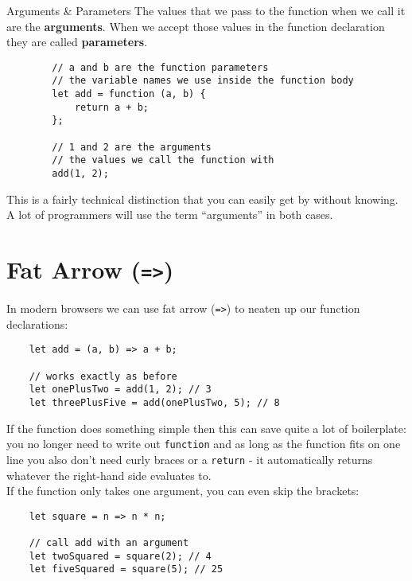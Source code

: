 \begin{infobox}{Arguments \& Parameters}
    The values that we pass to the function when we call it are the \textbf{arguments}. When we accept those values in the function declaration they are called \textbf{parameters}.

    \begin{verbatim}
        // a and b are the function parameters
        // the variable names we use inside the function body
        let add = function (a, b) {
            return a + b;
        };

        // 1 and 2 are the arguments
        // the values we call the function with
        add(1, 2);
    \end{verbatim}

    This is a fairly technical distinction that you can easily get by without knowing. A lot of programmers will use the term ``arguments'' in both cases.
\end{infobox}


\section{Fat Arrow (\texttt{=>})}

In modern browsers we can use fat arrow (\texttt{=>}) to neaten up our function declarations:

\begin{verbatim}
    let add = (a, b) => a + b;

    // works exactly as before
    let onePlusTwo = add(1, 2); // 3
    let threePlusFive = add(onePlusTwo, 5); // 8
\end{verbatim}

If the function does something simple then this can save quite a lot of boilerplate: you no longer need to write out \texttt{function} and as long as the function fits on one line you also don't need curly braces or a \texttt{return} - it automatically returns whatever the right-hand side evaluates to.
\\


If the function only takes one argument, you can even skip the brackets:

\begin{verbatim}
    let square = n => n * n;

    // call add with an argument
    let twoSquared = square(2); // 4
    let fiveSquared = square(5); // 25
\end{verbatim}


